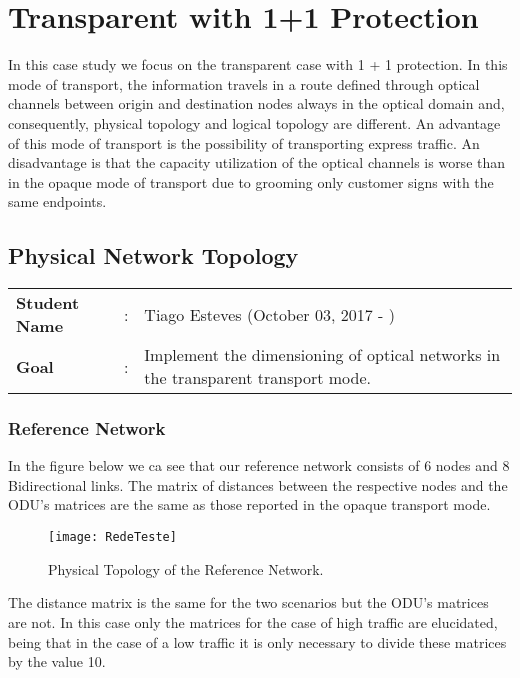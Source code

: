\clearpage

\section{Transparent with 1+1 Protection}
In this case study we focus on the transparent case with 1 + 1 protection.
In this mode of transport, the information travels in a route defined through optical channels between origin and destination nodes always in the optical domain and, consequently, physical topology and logical topology are different.
An advantage of this mode of transport is the possibility of transporting express traffic.
An disadvantage is that the capacity utilization of the optical channels is worse than in the opaque mode of transport due to grooming only customer signs with the same endpoints.

\subsection{Physical Network Topology}
\begin{tcolorbox}	
\begin{tabular}{p{2.75cm} p{0.2cm} p{10.5cm}} 	
\textbf{Student Name}  &:& Tiago Esteves    (October 03, 2017 - )\\
\textbf{Goal}          &:& Implement the dimensioning of optical networks in the transparent transport mode.
\end{tabular}
\end{tcolorbox}
\vspace{-5pt}

\subsubsection{Reference Network}
In the figure below we ca see that our reference network consists of 6 nodes and 8 Bidirectional links.
The matrix of distances between the respective nodes and the ODU's matrices are the same as those reported in the opaque transport mode.

\begin{figure}[h!]
\centering
\texttt{[image: RedeTeste]}
\caption{Physical Topology of the Reference Network.}
\end{figure}

The distance matrix is the same for the two scenarios but the ODU's matrices are not.
In this case only the matrices for the case of high traffic are elucidated, being that in the case of a low traffic it is only necessary to divide these matrices by the value 10.

